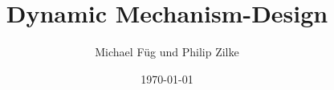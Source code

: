 \documentclass{beamer}
\title{Dynamic Mechanism-Design}
\author{Michael F\"ug und Philip Zilke}
\date{\today}
\begin{document}
\maketitle

\frame{\tableofcontents}




\end{document}
